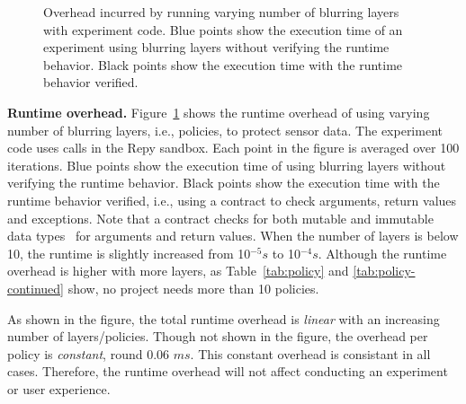 \begin{figure}
\caption{\small Overhead incurred by running varying number of blurring 
layers with experiment code. Blue points show the execution time of 
an experiment using blurring layers without verifying the runtime behavior. 
Black points show the execution time with the runtime behavior verified. 
\label{fig-time}}
\end{figure}

\textbf{Runtime overhead.}
Figure~\ref{fig-time} shows the runtime overhead of using varying number of 
blurring layers, i.e., policies, to protect sensor data. The experiment code 
uses calls  in the Repy sandbox. Each point in the 
figure is averaged over 100 iterations. Blue points show the execution time of 
using blurring layers without verifying the runtime behavior. Black points 
show the execution time with the runtime behavior verified, i.e., using a 
contract to check arguments, return values and exceptions. Note that a 
contract checks for both mutable and immutable data types~\cite{muta} 
for arguments and return values. When the number of layers is below 10, 
the runtime is slightly increased from 10$^{-5} s$ to 10$^{-4} s$. Although
the runtime overhead is higher with more layers, as Table~\ref{tab:policy} 
and \ref{tab:policy-continued} show, no project needs more than 10
policies. 

As shown in the figure, the total runtime 
overhead is \textit{linear} with an increasing number of layers/policies.
Though not shown in the figure, the overhead per policy is 
\textit{constant}, round 0.06 $ms$. This constant overhead is consistant in all 
cases. Therefore, the runtime overhead will not affect conducting an 
experiment or user experience.


